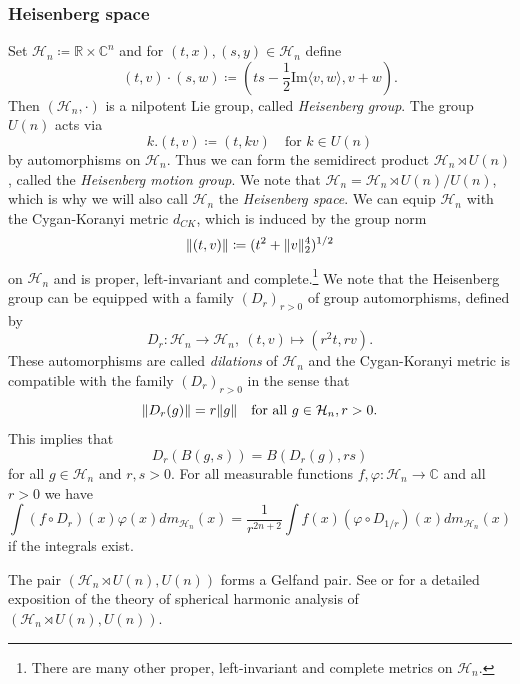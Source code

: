 \documentclass[12pt,reqno,a4paper]{amsart}
\theoremstyle{theorem}
\theoremstyle{definition}
\numberwithin{theorem}{section}
\numberwithin{equation}{section}
\newcommand{\R}{\mathbb{R}}
\newcommand{\C}{\mathbb{C}}
\DeclarePairedDelimiter{\norm}{\lVert}{\rVert}
\begin{document}
\subsubsection{Heisenberg space}
Set $\mathcal{H}_n\coloneqq \R\times \C^n$ and for $(t,x), (s, y)\in \mathcal{H}_n$ define
\[(t,v)\cdot (s,w)\coloneqq (ts-\frac{1}{2}\mathrm{Im} \langle v,w\rangle, v+w).\]
Then $(\mathcal{H}_n,\cdot)$ is a nilpotent Lie group, called \emph{Heisenberg group}.
The group $U(n)$ acts via
\[k.(t,v)\coloneqq (t, kv)\quad\text{for $k\in U(n)$}\]
by automorphisms on $\mathcal{H}_n$. Thus we can form the semidirect product $\mathcal{H}_n\rtimes U(n)$, called the \emph{Heisenberg motion group}. We note that $\mathcal{H}_n=\mathcal{H}_n\rtimes U(n)/U(n)$, which is why we will also call $\mathcal{H}_n$ the \emph{Heisenberg space}.
We can equip $\mathcal{H}_n$ with the Cygan-Koranyi metric $d_{CK}$, which is induced by the group norm
\[
\norm{(t,v)}\coloneqq (t^2+\norm{v}_2^4)^{1/2}
\]
on $\mathcal{H}_n$ and is proper, left-invariant and complete.\footnote{There are many other proper, left-invariant and complete metrics on $\mathcal{H}_n$.} We note that the Heisenberg group can be equipped with a family $(D_r)_{r> 0}$ of group automorphisms, defined by 
\[D_r:\mathcal{H}_n\to \mathcal{H}_n,\ (t,v)\mapsto (r^2t,rv).\]
These automorphisms are called \emph{dilations} of $\mathcal{H}_n$ and the Cygan-Koranyi metric is compatible with the family $(D_r)_{r>0}$
in the sense that
\[\norm{D_r(g)} = r\norm{g}\quad \text{for all }g\in \mathcal{H}_n, r>0.\]
This implies that 
\[D_r(B(g,s)) = B(D_r(g), rs)\]
 for all $g\in \mathcal{H}_n$ and $r,s>0$.
 For all measurable functions $f,\varphi:\mathcal{H}_n\to \C$ and all $r>0$ we have
 \[\int (f\circ D_r)(x) \varphi(x) dm_{\mathcal{H}_n}(x) = \frac{1}{r^{2n+2}}\int f(x)(\varphi\circ D_{1/r})(x)dm_{\mathcal{H}_n}(x)\]
 if the integrals exist.
 
The pair $(\mathcal{H}_n\rtimes U(n), U(n))$ forms a Gelfand pair. See \cite{Thangavelu} or \cite{Wolf} for a detailed exposition of the theory of spherical harmonic analysis of $(\mathcal{H}_n\rtimes U(n), U(n))$. 
\end{document}
